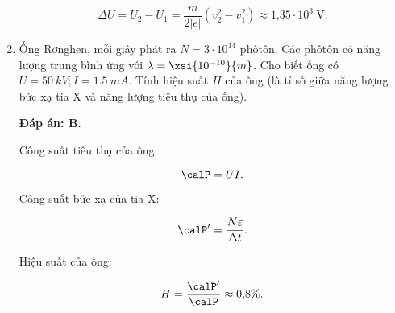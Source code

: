 \begin{enumerate}[label=\bfseries Câu \arabic*:]
{		$$\Delta U = U_2 - U_1 = \dfrac{m}{2|e|} (v^2_2 - v_1^2) \approx \text{1,35} \cdot 10^3\ \text{V}.$$ 
	}
		\item {} 
	\cauhoi
	{Ống Rơnghen, mỗi giây phát ra $N = 3\cdot 10^{14}$ phôtôn. Các phôtôn có năng lượng trung bình ứng với  $\lambda=\xsi{10^{-10}}{m}$. Cho biết ống có  $U=\SI{50}{kV}; I = \SI{1,5}{mA}$. Tính hiệu suất $H$ của ống (là tỉ số giữa năng lượng bức xạ tia X và năng lượng tiêu thụ của ống).
		
		
	}
	
	\loigiai
	{		\textbf{Đáp án: B.}
		
		
		Công suất tiêu thụ của ống:
		
		$$\calP =UI.$$
		
		Công suất bức xạ của tia X:
		
		$$\calP' = \dfrac{N\varepsilon}{\Delta t}.$$
		
		Hiệu suất của ống: 
		
		$$H = \dfrac{\calP'}{\calP} \approx \text{0,8}\%.$$
	}
	
\end{enumerate}

